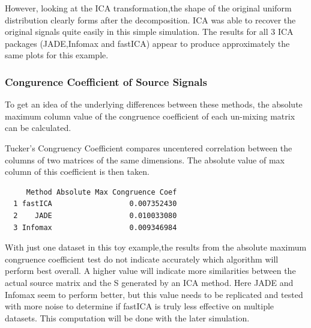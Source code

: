 \documentclass[12pt,twoside]{amherstthesis}
\begin{document}
  However, looking at the ICA transformation,the shape of the original
  uniform distribution clearly forms after the decomposition. ICA was able
  to recover the original signals quite easily in this simple simulation.
  The results for all 3 ICA packages (JADE,Infomax and fastICA) appear to
  produce approximately the same plots for this example.
  
  \subsubsection{Congurence Coefficient of Source
  Signals}\label{congurence-coefficient-of-source-signals}
  
  To get an idea of the underlying differences between these methods, the
  absolute maximum column value of the congruence coefficient of each
  un-mixing matrix can be calculated.
  
  Tucker's Congruency Coefficient compares uncentered correlation between
  the columns of two matrices of the same dimensions. The absolute value
  of max column of this coefficient is then taken.
  
  \begin{Shaded}
  \begin{Highlighting}[]
  \StringTok{ } \NormalTok{)[}\NormalTok{] }
  \StringTok{ }\NormalTok{(}\NormalTok{(}\OperatorTok{$}
  \StringTok{ }\NormalTok{(}\NormalTok{(}\OperatorTok{$}
  \StringTok{ }\NormalTok{(}\NormalTok{(}\OperatorTok{$}
  \end{Highlighting}
  \end{Shaded}
  
  \begin{verbatim}
     Method Absolute Max Congruence Coef
  1 fastICA                  0.007352430
  2    JADE                  0.010033080
  3 Infomax                  0.009346984
  \end{verbatim}
  
  With just one dataset in this toy example,the results from the absolute
  maximum congruence coefficient test do not indicate accurately which
  algorithm will perform best overall. A higher value will indicate more
  similarities between the actual source matrix and the S generated by an
  ICA method. Here JADE and Infomax seem to perform better, but this value
  needs to be replicated and tested with more noise to determine if
  fastICA is truly less effective on multiple datasets. This computation
  will be done with the later simulation.
  
\end{document}
